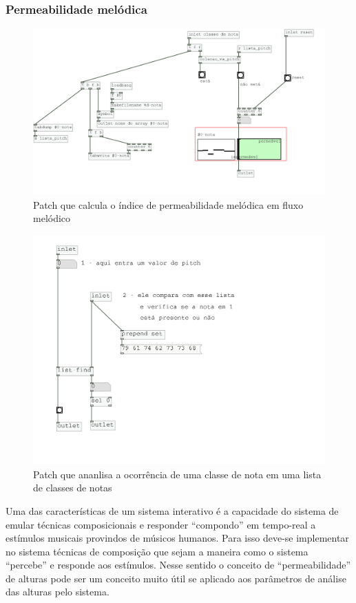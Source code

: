\documentclass{ppgmus}
\begin{document}
\subsubsection{Permeabilidade melódica}

\begin{figure}
\includegraphics[scale=.5]{permeabilidade}
\caption{Patch que calcula o índice de permeabilidade melódica em fluxo melódico}
\label{permeabilidade}
\end{figure}

\begin{figure}
\includegraphics[scale=.5]{colecao_pitch}
\caption{Patch que ananlisa a ocorrência de uma classe de nota em uma lista de classes de notas}
\label{colecao-pitch}
\end{figure}



Uma das características de um sistema interativo é a capacidade do sistema
de emular técnicas composicionais e responder ``compondo'' em tempo-real a
estímulos musicais provindos de músicos humanos. Para isso deve-se implementar
no sistema técnicas de composição que sejam a maneira como o sistema ``percebe''
e responde aos estímulos. Nesse sentido o conceito de “permeabilidade” de 
alturas \cite{ligeti58:transformacoes} pode ser um conceito muito útil se aplicado aos parâmetros
de análise das alturas pelo sistema. 
\end{document}

